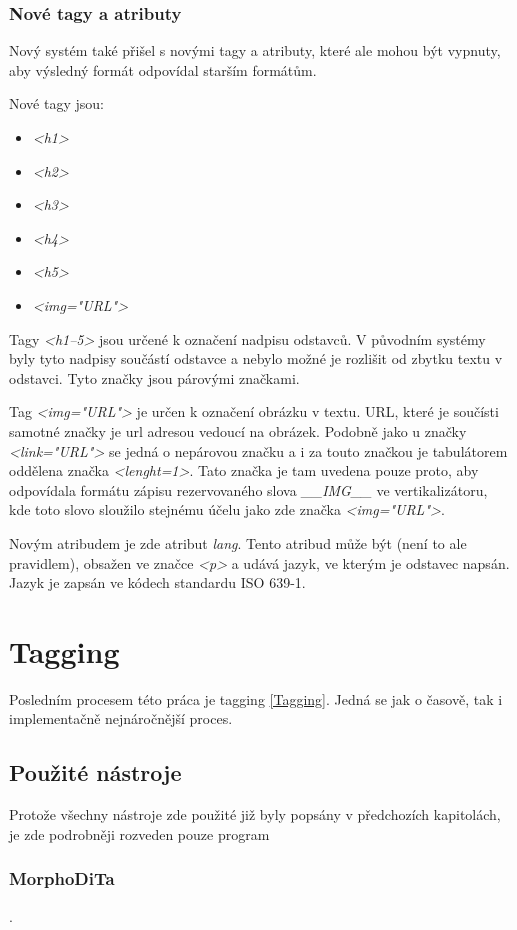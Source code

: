 \subsection{Nové tagy a atributy}
Nový systém také přišel s novými tagy a atributy, které ale mohou být vypnuty, aby výsledný formát odpovídal
starším formátům.

Nové tagy jsou:
\begin{itemize}
    \item \textit{<h1>}
    \item \textit{<h2>}
    \item \textit{<h3>}
    \item \textit{<h4>}
    \item \textit{<h5>}
    \item \textit{<img="URL"\textgreater}
\end{itemize}

Tagy \textit{<h1--5>} jsou určené k označení nadpisu odstavců. V původním systémy byly tyto nadpisy součástí
odstavce a nebylo možné je rozlišit od zbytku textu v odstavci. Tyto značky jsou párovými značkami.

Tag \textit{<img="URL"\textgreater} je určen k označení obrázku v textu. URL, které je součísti samotné značky je url adresou
vedoucí na obrázek. Podobně jako u značky \textit{<link="URL"\textgreater} se jedná o nepárovou značku a i za touto značkou
je tabulátorem oddělena značka \textit{<lenght=1>}. Tato značka je tam uvedena pouze proto, aby odpovídala
formátu zápisu rezervovaného slova \textit{\_\_IMG\_\_} ve vertikalizátoru, kde toto slovo sloužilo stejnému
účelu jako zde značka \textit{<img="URL"\textgreater}.

Novým atribudem je zde atribut \textit{lang}. Tento atribud může být (není to ale pravidlem), obsažen ve značce
\textit{<p>} a udává jazyk, ve kterým je odstavec napsán. Jazyk je zapsán ve kódech standardu ISO 639-1.

\chapter{Tagging}
\label{morphodita}
Posledním procesem této práca je tagging \ref{Tagging}. Jedná se jak o časově, tak i implementačně
nejnáročnější proces.

\section{Použité nástroje}
Protože všechny nástroje zde použité již byly popsány v předchozích kapitolách, je zde podrobněji
rozveden pouze program \subsection{MorphoDiTa}.

